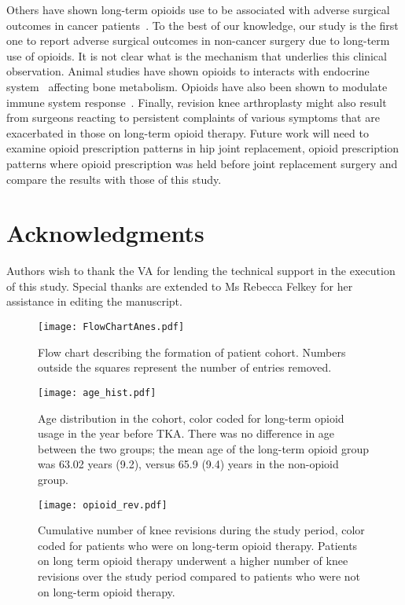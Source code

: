 \documentclass[a4paper]{article}
\begin{document}
\indent Others have shown long-term opioids use to be associated with adverse surgical outcomes in cancer patients~\cite{Lungs1,prostate1}. To the best of our knowledge, our study is the first one to report adverse surgical outcomes in non-cancer surgery due to long-term use of opioids. It is not clear what is the mechanism that underlies this clinical observation. Animal studies have shown opioids to interacts with endocrine system~\cite{endo1, endo2,OPIAD1,OPIAD2,endo3} affecting bone metabolism. Opioids have also been shown to modulate immune system response~\cite{immuno1,immuno2,immuno3,immuno4}. Finally, revision knee arthroplasty might also result from surgeons reacting to persistent complaints of various symptoms that are exacerbated in those on long-term opioid therapy. \newline Future work will need to examine opioid prescription patterns in hip joint replacement, opioid prescription patterns where opioid prescription was held before joint replacement surgery and compare the results with those of this study. 
\section*{Acknowledgments}
Authors wish to thank the VA for lending the technical support in the execution of this study. Special thanks are extended to Ms Rebecca Felkey for her assistance in editing the manuscript.

\begin{center}
\begin{figure}
\texttt{[image: FlowChartAnes.pdf]}
\caption{Flow chart describing the formation of patient cohort. Numbers outside the squares represent the number of entries removed.}
\end{figure}
\end{center}
%
\newpage
\begin{center}
\begin{figure}
\texttt{[image: age\_hist.pdf]}
\caption{Age distribution in the cohort, color coded for long-term opioid usage
          in the year before TKA. There was no difference in age between the two groups;
          the mean age of the long-term opioid group was 63.02 years (9.2), versus 65.9 (9.4) years in the non-opioid group.}
          
\end{figure}		
\end{center}
\newpage
\begin{center}
\begin{figure}
\texttt{[image: opioid\_rev.pdf]}
\caption{Cumulative number of knee revisions during the study period, color coded
          for patients who were on long-term opioid therapy. Patients on long term opioid
          therapy underwent a higher number of knee revisions over the study period
          compared to patients who were not on long-term opioid therapy.}
\end{figure}		
\end{center}
\end{document}
